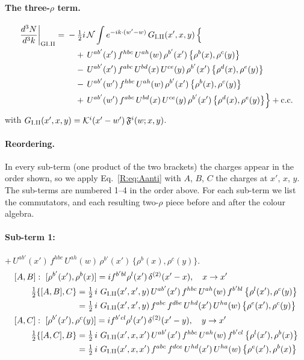 \documentclass[10pt]{article}
\numberwithin{equation}{section}
\newcommand{\KK}{\mathcal K}
\newcommand{\NN}{\mathcal N}
\begin{document}
\paragraph{The three-$\rho$ term.}
\begin{align}
\frac{d^3N}{d^3k}\bigg|_{\rm GI.II}={}&-\tfrac12i\,\NN\int e^{-ik\cdot(w'-w)}\,G_{\rm I.II}(x',x,y)\,\Big\{\notag\\
&\quad +\,U^{ab'}(x')\,f^{hbc}\,U^{ah}(w)\,\rho^{b'}(x')\,\big\{\rho^{b}(x),\rho^{c}(y)\big\}\notag\\
&\quad -\,U^{ab'}(x')\,f^{abc}\,U^{bd}(x)\,U^{ce}(y)\,\rho^{b'}(x')\,\big\{\rho^{d}(x),\rho^{e}(y)\big\}\notag\\
&\quad -\,U^{ab'}(w')\,f^{hbc}\,U^{ah}(w)\,\rho^{b'}(x')\,\big\{\rho^{b}(x),\rho^{c}(y)\big\}\notag\\
&\quad +\,U^{ab'}(w')\,f^{abc}\,U^{bd}(x)\,U^{ce}(y)\,\rho^{b'}(x')\,\big\{\rho^{d}(x),\rho^{e}(y)\big\}\Big\}+{\rm c.c.}\label{R:eq:in-GI.II}
\end{align}
with $G_{\rm I.II}(x',x,y)=\KK^{i}(x'-w')\,\mathfrak F^{i}(w;x,y)$.
\paragraph{Reordering.} In every sub-term (one product of the two brackets) the charges appear in the order shown, so we apply Eq.~\eqref{R:eq:Aanti} with $A$, $B$, $C$ the charges at $x'$, $x$, $y$. The sub-terms are numbered 1--4 in the order above. For each sub-term we list the commutators, and each resulting two-$\rho$ piece before and after the colour algebra.
\paragraph{Sub-term 1:} $+\,U^{ab'}(x')\,f^{hbc}\,U^{ah}(w)\,\rho^{b'}(x')\,\big\{\rho^{b}(x),\rho^{c}(y)\big\}$.
\begin{align}
&[A,B]:\ [\rho^{b'}(x'),\rho^{b}(x)]=i f^{b'bl}\rho^{l}(x')\,\delta^{(2)}(x'-x),\quad x\to x'\notag\\
&\qquad \tfrac12\{[A,B],C\}=\tfrac12\,i\,\,G_{\rm I.II}(x',x',y)\,U^{ab'}(x')\,f^{hbc}\,U^{ah}(w)\,f^{b'bl}\,\big\{\rho^{l}(x'),\rho^{c}(y)\big\}\notag\\
&\qquad\phantom{\tfrac12\{[A,B],C\}}=\tfrac12\,i\,\,G_{\rm I.II}(x',x',y)\,f^{abc}\,f^{dbe}\,U^{hd}(x')\,U^{ha}(w)\,\big\{\rho^{e}(x'),\rho^{c}(y)\big\}
\label{R:eq:GI.II-1-AB}\\
&[A,C]:\ [\rho^{b'}(x'),\rho^{c}(y)]=i f^{b'cl}\rho^{l}(x')\,\delta^{(2)}(x'-y),\quad y\to x'\notag\\
&\qquad \tfrac12\{[A,C],B\}=\tfrac12\,i\,\,G_{\rm I.II}(x',x,x')\,U^{ab'}(x')\,f^{hbc}\,U^{ah}(w)\,f^{b'cl}\,\big\{\rho^{l}(x'),\rho^{b}(x)\big\}\notag\\
&\qquad\phantom{\tfrac12\{[A,C],B\}}=\tfrac12\,i\,\,G_{\rm I.II}(x',x,x')\,f^{abc}\,f^{dce}\,U^{hd}(x')\,U^{ha}(w)\,\big\{\rho^{e}(x'),\rho^{b}(x)\big\}
\label{R:eq:GI.II-1-AC}
\end{align}
\end{document}
